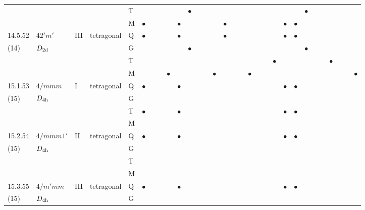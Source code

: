 \documentclass[fleqn,9pt,landscape]{jsarticle}
\begin{document}
\begin{longtable}{lllll|l|lll|ll|lll|l|lll|lll|l|ll|lll|lll}
 &  &  &  & T &  &  &  &  &  & $\bullet$ &  &  &  &  &  &  &  &  &  &  &  &  & $\bullet$ &  &  &  &  &  &  \\
 &  &  &  & M & $\bullet$ &  &  &  & $\bullet$ &  &  &  &  & $\bullet$ &  &  &  &  &  &  & $\bullet$ & $\bullet$ &  &  &  &  &  &  &  \\ \hline
14.5.52 & \texttt{$\bar{4}2'm'$} & III & tetragonal & Q & $\bullet$ &  &  &  & $\bullet$ &  &  &  &  & $\bullet$ &  &  &  &  &  &  & $\bullet$ & $\bullet$ &  &  &  &  &  &  &  \\
(14) & $D_{\rm 2d}$ &  &  & G &  &  &  &  &  & $\bullet$ &  &  &  &  &  &  &  &  &  &  &  &  & $\bullet$ &  &  &  &  &  &  \\
 &  &  &  & T &  &  &  &  &  &  &  &  &  &  &  &  &  &  &  & $\bullet$ &  &  &  &  &  & $\bullet$ &  &  &  \\
 &  &  &  & M &  &  &  & $\bullet$ &  &  &  &  & $\bullet$ &  &  &  & $\bullet$ &  &  &  &  &  &  &  &  &  &  &  & $\bullet$ \\ \hline
15.1.53 & \texttt{$4/mmm$} & I & tetragonal & Q & $\bullet$ &  &  &  & $\bullet$ &  &  &  &  &  &  &  &  &  &  &  & $\bullet$ & $\bullet$ &  &  &  &  &  &  &  \\
(15) & $D_{\rm 4h}$ &  &  & G &  &  &  &  &  &  &  &  &  &  &  &  &  &  &  &  &  &  &  &  &  &  &  &  &  \\
 &  &  &  & T & $\bullet$ &  &  &  & $\bullet$ &  &  &  &  &  &  &  &  &  &  &  & $\bullet$ & $\bullet$ &  &  &  &  &  &  &  \\
 &  &  &  & M &  &  &  &  &  &  &  &  &  &  &  &  &  &  &  &  &  &  &  &  &  &  &  &  &  \\ \hline
15.2.54 & \texttt{$4/mmm1'$} & II & tetragonal & Q & $\bullet$ &  &  &  & $\bullet$ &  &  &  &  &  &  &  &  &  &  &  & $\bullet$ & $\bullet$ &  &  &  &  &  &  &  \\
(15) & $D_{\rm 4h}$ &  &  & G &  &  &  &  &  &  &  &  &  &  &  &  &  &  &  &  &  &  &  &  &  &  &  &  &  \\
 &  &  &  & T &  &  &  &  &  &  &  &  &  &  &  &  &  &  &  &  &  &  &  &  &  &  &  &  &  \\
 &  &  &  & M &  &  &  &  &  &  &  &  &  &  &  &  &  &  &  &  &  &  &  &  &  &  &  &  &  \\ \hline
15.3.55 & \texttt{$4/m'mm$} & III & tetragonal & Q & $\bullet$ &  &  &  & $\bullet$ &  &  &  &  &  &  &  &  &  &  &  & $\bullet$ & $\bullet$ &  &  &  &  &  &  &  \\
(15) & $D_{\rm 4h}$ &  &  & G &  &  &  &  &  &  &  &  &  &  &  &  &  &  &  &  &  &  &  &  &  &  &  &  &  \\

\end{longtable}
\end{document}
